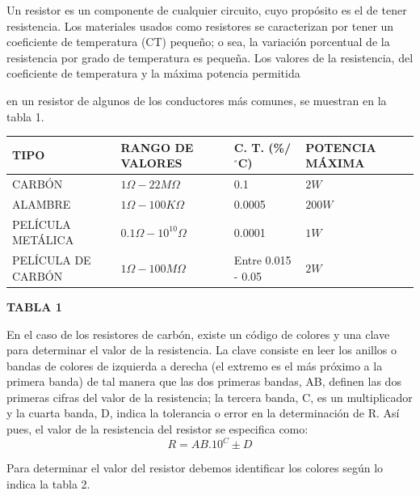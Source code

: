 \documentclass[11pt,a4paper]{article}
\begin{document}
Un resistor es un componente de cualquier circuito, cuyo propósito es el de tener resistencia. Los materiales usados como resistores se caracterizan por tener un coeficiente de temperatura (CT) pequeño; o sea, la variación porcentual de la resistencia por grado de temperatura es pequeña. Los valores de la resistencia, del coeficiente de temperatura y la máxima potencia permitida

en un resistor de algunos de los conductores más comunes, se muestran en la tabla 1.

\begin{center}\small
\begin{tabular}{llll}
\toprule
TIPO & RANGO DE VALORES & C. T. (\%/$^{\circ}$C) & POTENCIA MÁXIMA \\
\midrule
CARBÓN & $1\Omega - 22M\Omega$ & 0.1 & $2W$ \\
ALAMBRE & $1\Omega - 100K\Omega$ & 0.0005 & $200W$ \\
PELÍCULA METÁLICA & $0.1\Omega - 10^{10}\Omega$ & 0.0001 & $1W$ \\
PELÍCULA DE CARBÓN & $1\Omega - 100M\Omega$ & Entre 0.015 - 0.05 & $2W$ \\
\bottomrule
\end{tabular}
\end{center}

\begin{center}\small\textbf{TABLA 1}\end{center}

En el caso de los resistores de carbón, existe un código de colores y una clave para determinar el valor de la resistencia. La clave consiste en leer los anillos o bandas de colores de izquierda a derecha (el extremo es el más próximo a la primera banda) de tal manera que las dos primeras bandas, AB, definen las dos primeras cifras del valor de la resistencia; la tercera banda, C, es un multiplicador y la cuarta banda, D, indica la tolerancia o error en la determinación de R. Así pues, el valor de la resistencia del resistor se especifica como: \[R = AB. 10^C \pm D\]

Para determinar el valor del resistor debemos identificar los colores según lo indica la tabla 2.
\end{document}
